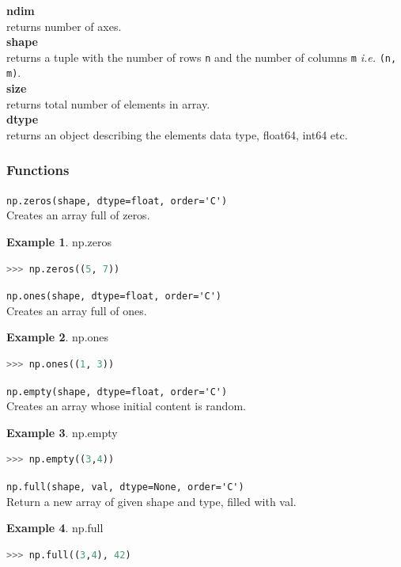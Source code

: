\documentclass{article}
\theoremstyle{definition}
\newtheorem{ex}{Example}[subsection]
\theoremstyle{remark}
\newcommand{\func}[2]{\noindent\lstinline{#1}\\#2}
\begin{document}
\noindent\textbf{ndim}\\
returns number of axes.\\

\noindent\textbf{shape}\\
returns a tuple with the number of rows \lstinline{n} and the number of columns \lstinline{m} \textit{i.e.} \lstinline{(n, m)}.\\

\noindent\textbf{size}\\
returns total number of elements in array.\\

\noindent\textbf{dtype}\\
returns an object describing the elements data type, float64, int64 etc.

\subsubsection{Functions}


\func{np.zeros(shape, dtype=float, order='C')}{Creates an array full of zeros.}

\begin{ex} np.zeros
\begin{lstlisting}[language=Python]
>>> np.zeros((5, 7))
\end{lstlisting}
\end{ex}


\func{np.ones(shape, dtype=float, order='C')}{Creates an array full of ones.}

\begin{ex} np.ones
\begin{lstlisting}[language=Python]
>>> np.ones((1, 3))
\end{lstlisting}
\end{ex}

\func{np.empty(shape, dtype=float, order='C')}{Creates an array whose initial content is random.}

\begin{ex} np.empty
\begin{lstlisting}[language=Python]
>>> np.empty((3,4))
\end{lstlisting}
\end{ex}

\func{np.full(shape, val, dtype=None, order='C')}{Return a new array of given shape and type, filled with val.}

\begin{ex} np.full
\begin{lstlisting}[language=Python]
>>> np.full((3,4), 42)
\end{lstlisting}
\end{ex}
\end{document}
